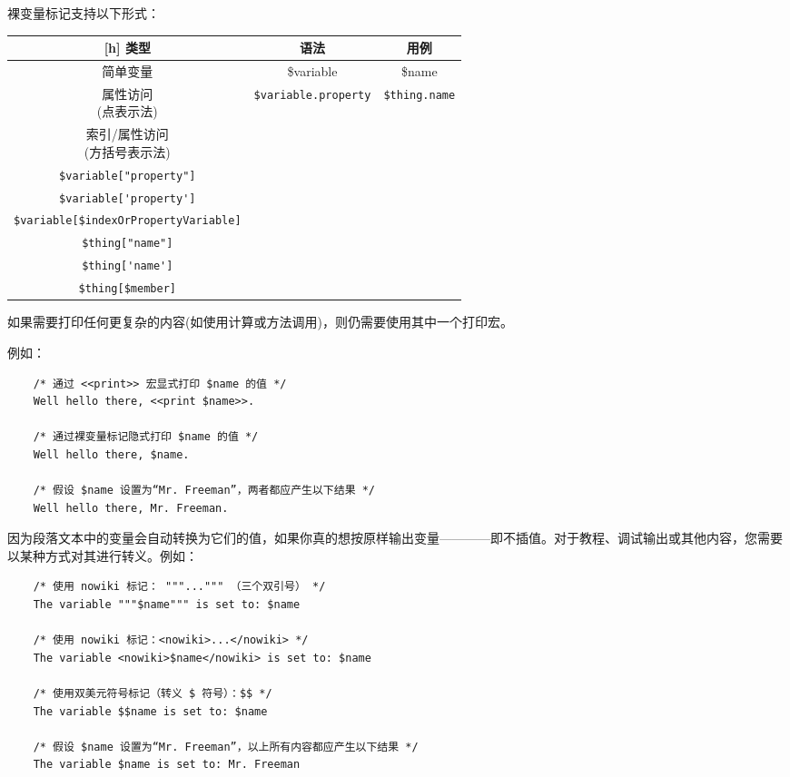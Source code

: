 \documentclass[hyperref,UTF8]{ctexart}
\begin{document}
裸变量标记支持以下形式：
\begin{center}
    \begin{tabular}{c|c|c}[h]
        \centering
        \textbf{类型} & \textbf{语法} & \textbf{用例}\\
        \hline \hline
        简单变量 & \$variable & \$name\\
        \hline
        \makecell{属性访问\\(点表示法)} & \verb|$variable.property| & \verb|$thing.name|\\
        \hline
        \makecell{索引/属性访问\\(方括号表示法)} & 
        \makecell{\verb|$variable[numericIndex]| \\ \verb|$variable["property"]| \\ \verb|$variable['property']| \\ \verb|$variable[$indexOrPropertyVariable]|} & 
        \makecell{\verb|$thing[0]| \\ \verb|$thing["name"]| \\ \verb|$thing['name']| \\ \verb|$thing[$member]|}
    \end{tabular}
\end{center}

如果需要打印任何更复杂的内容(如使用计算或方法调用)，则仍需要使用其中一个打印宏。

例如：
\begin{lstlisting}
    /* 通过 <<print>> 宏显式打印 $name 的值 */
    Well hello there, <<print $name>>.
    
    /* 通过裸变量标记隐式打印 $name 的值 */
    Well hello there, $name.
    
    /* 假设 $name 设置为“Mr. Freeman”，两者都应产生以下结果 */
    Well hello there, Mr. Freeman.
\end{lstlisting}

因为段落文本中的变量会自动转换为它们的值，如果你真的想按原样输出变量————即不插值。对于教程、调试输出或其他内容，您需要以某种方式对其进行转义。例如：
\begin{lstlisting}
    /* 使用 nowiki 标记： """...""" （三个双引号） */
    The variable """$name""" is set to: $name
    
    /* 使用 nowiki 标记：<nowiki>...</nowiki> */
    The variable <nowiki>$name</nowiki> is set to: $name
    
    /* 使用双美元符号标记（转义 $ 符号）：$$ */
    The variable $$name is set to: $name
    
    /* 假设 $name 设置为“Mr. Freeman”，以上所有内容都应产生以下结果 */
    The variable $name is set to: Mr. Freeman
\end{lstlisting}
\end{document}
